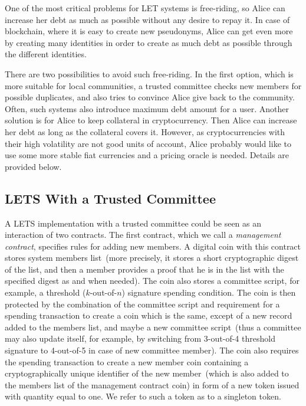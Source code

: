 \documentclass[]{llncs}   %
\begin{document}
One of the most critical problems for LET systems is free-riding, so Alice can increase her debt as much as possible without any desire to repay it. In case of blockchain, where it is easy to create new pseudonyms, Alice can get even more by creating many identities in order to create as much debt as possible through the different identities.

There are two possibilities to avoid such free-riding. In the first option, which is more suitable for local communities, a trusted committee checks new members for possible duplicates, and also tries to convince Alice give back to the community. Often, such systems also introduce maximum debt amount for a user. Another solution is for Alice to keep collateral in cryptocurrency. Then Alice can increase her debt as long as the collateral covers it. However, as cryptocurrencies with their high volatility are not good units of account, Alice probably would like to use some more stable fiat currencies and a pricing oracle is needed. Details are provided below.

\subsection{LETS With a Trusted Committee}
\label{sec-trusted}

A LETS implementation with a trusted committee could be seen as an interaction of two contracts. The first contract, which we
call a {\em management contract}, specifies rules for adding new members. A digital coin with this contract stores system members list~(more precisely, it stores a short cryptographic digest of the list, and then a member provides a proof that he is in the list with the specified digest as and when needed). The coin also stores a committee script, for example, a threshold ($k$-out-of-$n$) signature spending condition. The coin is then protected by the combination of the committee script and requirement for a spending transaction to create a coin which is the same, except of a new record added to the members list, and maybe a new committee script~(thus a committee may also update itself, for example, by switching from 3-out-of-4 threshold signature to 4-out-of-5 in case of new committee member). The coin also requires the spending transaction to create a new member coin containing a cryptographically unique identifier of the new member~(which is also added to the members list of the management contract coin) in form of a new token issued with quantity equal to one. We refer to such a token as to a singleton token.
\end{document}
